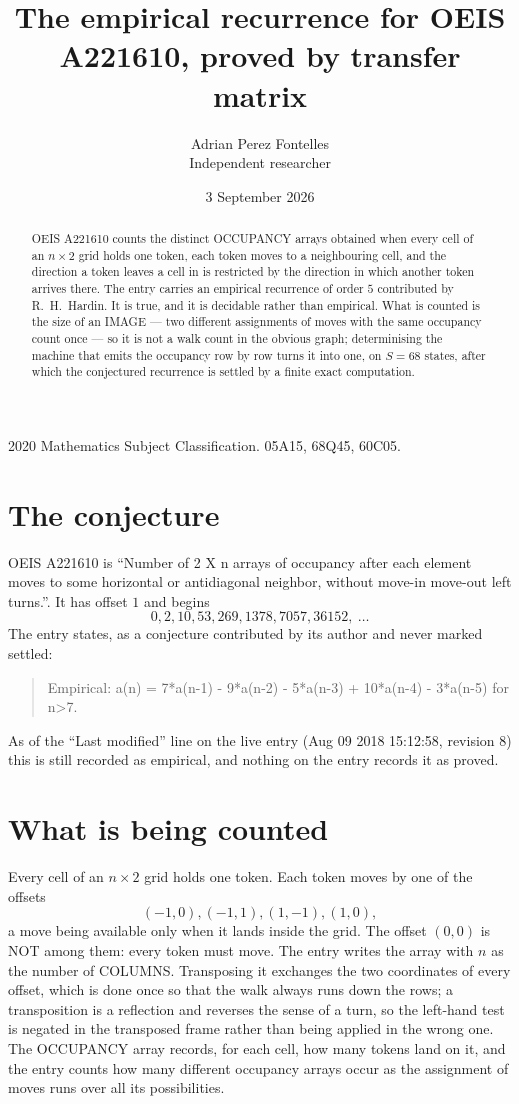 \documentclass[11pt,a4paper]{article}
\title{The empirical recurrence for OEIS A221610, proved by transfer matrix}
\author{Adrian Perez Fontelles\\ \small Independent researcher}
\date{3 September 2026}
\theoremstyle{plain}
\theoremstyle{definition}
\begin{document}
\maketitle

\begin{abstract}
OEIS A221610 counts the distinct OCCUPANCY arrays obtained when every cell of an $n\times2$ grid
holds one token, each token moves to a neighbouring cell, and the direction a token leaves a
cell in is restricted by the direction in which another token arrives there. The entry carries
an empirical recurrence of order $5$ contributed by R.~H.~Hardin. It is true, and it is
decidable rather than empirical. What is counted is the size of an IMAGE --- two different
assignments of moves with the same occupancy count once --- so it is not a walk count in the
obvious graph; determinising the machine that emits the occupancy row by row turns it into
one, on $S=68$ states, after which the conjectured recurrence is settled by a finite exact
computation.
\end{abstract}

\noindent\small 2020 Mathematics Subject Classification. 05A15, 68Q45, 60C05.\normalsize

\section{The conjecture}

OEIS A221610 is ``Number of 2 X n arrays of occupancy after each element moves to some horizontal or antidiagonal neighbor, without move-in move-out left turns.''. It has offset $1$ and begins
\[
0, 2, 10, 53, 269, 1378, 7057, 36152,\ \dots
\]
The entry states, as a conjecture contributed by its author and never marked settled:
\begin{quote}
Empirical: a(n) = 7*a(n-1) - 9*a(n-2) - 5*a(n-3) + 10*a(n-4) - 3*a(n-5) for n>7.
\end{quote}
As of the ``Last modified'' line on the live entry (Aug 09 2018 15:12:58, revision 8) this is still
recorded as empirical, and nothing on the entry records it as proved.

\section{What is being counted}

Every cell of an $n\times2$ grid holds one token. Each token moves by one of the offsets
\[
(-1,0), (-1,1), (1,-1), (1,0),
\]
a move being available only when it lands inside the grid. The offset $(0,0)$ is NOT among them: every token must move. The entry writes the array with $n$ as the number of COLUMNS. Transposing it exchanges the two coordinates of every offset, which is done once so that the walk always runs down the rows; a transposition is a reflection and reverses the sense of a turn, so the left-hand test is negated in the transposed frame rather than being applied in the wrong one. The OCCUPANCY array
records, for each cell, how many tokens land on it, and the entry counts how many different
occupancy arrays occur as the assignment of moves runs over all its possibilities.
\end{document}
